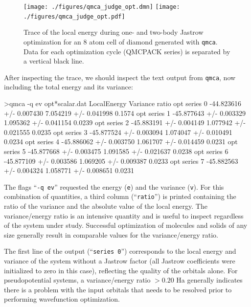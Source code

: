 \begin{figure}
\begin{center}
\ifdefined\HCode  
\texttt{[image: ./figures/qmca\_judge\_opt.dmn]}
\else
\texttt{[image: ./figures/qmca\_judge\_opt.pdf]}
\fi
\end{center}
\caption{Trace of the local energy during one- and two-body Jastrow optimization for an 8 atom cell of diamond generated with \texttt{qmca}.  Data for each optimization cycle (QMCPACK series) is separated by a vertical black line.
}
\label{fig:qmca_judge_opt}
\end{figure}

After inspecting the trace, we should inspect the text output 
from \texttt{qmca}, now including the total energy and its variance:
\begin{shade}
>qmca -q ev opt*scalar.dat
                            LocalEnergy               Variance           ratio 
opt  series 0  -44.823616 +/- 0.007430   7.054219 +/- 0.041998   0.1574 
opt  series 1  -45.877643 +/- 0.003329   1.095362 +/- 0.041154   0.0239 
opt  series 2  -45.883191 +/- 0.004149   1.077942 +/- 0.021555   0.0235 
opt  series 3  -45.877524 +/- 0.003094   1.074047 +/- 0.010491   0.0234 
opt  series 4  -45.886062 +/- 0.003750   1.061707 +/- 0.014459   0.0231 
opt  series 5  -45.877668 +/- 0.003475   1.091585 +/- 0.021637   0.0238 
opt  series 6  -45.877109 +/- 0.003586   1.069205 +/- 0.009387   0.0233 
opt  series 7  -45.882563 +/- 0.004324   1.058771 +/- 0.008651   0.0231 
\end{shade}
\noindent
The flags ``\texttt{-q ev}'' requested the energy (\texttt{e}) and 
the variance (\texttt{v}).  For this combination of quantities, a 
third column (``\texttt{ratio}'') is printed containing the ratio 
of the variance and the absolute value of the local energy.
The variance/energy ratio is an intensive quantity and is useful  
to inspect regardless of the system under study.  Successful 
optimization of molecules and solids of any size generally result 
in comparable values for the variance/energy ratio. 

The first line of 
the output (``\texttt{series 0}'') corresponds to the local energy 
and variance of the system without a Jastrow factor (all Jastrow 
coefficients were initialized to zero in this case), reflecting the 
quality of the orbitals alone. For pseudopotential systems, a 
variance/energy ratio $>0.20$ Ha generally indicates there is a problem 
with the input orbitals that needs to be resolved prior to 
performing wavefunction optimization.  

